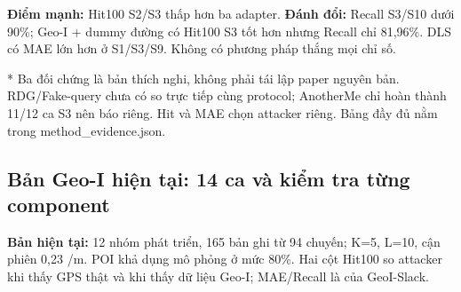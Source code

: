 \documentclass[10pt,a4paper]{article}
\begin{document}
\textbf{Điểm mạnh:} Hit100 S2/S3 thấp hơn ba adapter. \textbf{Đánh đổi:} Recall S3/S10 dưới 90\%; Geo-I + dummy đường có Hit100 S3 tốt hơn nhưng Recall chỉ 81,96\%. DLS có MAE lớn hơn ở S1/S3/S9. Không có phương pháp thắng mọi chỉ số.

* Ba đối chứng là bản thích nghi, không phải tái lập paper nguyên bản. RDG/Fake-query chưa có so trực tiếp cùng protocol; AnotherMe chỉ hoàn thành 11/12 ca S3 nên báo riêng. Hit và MAE chọn attacker riêng. Bảng đầy đủ nằm trong method\_\allowbreak{}evidence.json.


\clearpage
\subsection{Bản Geo-I hiện tại: 14 ca và kiểm tra từng component}\label{sub:3.3}
\textbf{Bản hiện tại:} 12 nhóm phát triển, 165 bản ghi từ 94 chuyến; K=5, L=10, cận phiên 0,23 /m. POI khả dụng mô phỏng ở mức 80\%. Hai cột Hit100 so attacker khi thấy GPS thật và khi thấy dữ liệu Geo-I; MAE/Recall là của GeoI-Slack.
\end{document}
